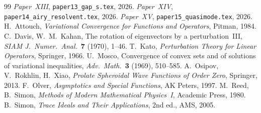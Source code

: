 \documentclass[12pt,a4paper]{amsart}
\theoremstyle{definition}
\begin{document}
\begin{thebibliography}{99}
 \textit{Paper~XIII}, \texttt{paper13\_gap\_s.tex}, 2026.
 \textit{Paper~XIV}, \texttt{paper14\_airy\_resolvent.tex}, 2026.
 \textit{Paper~XV}, \texttt{paper15\_quasimode.tex}, 2026.
 H.~Attouch, \textit{Variational Convergence
  for Functions and Operators}, Pitman, 1984.
 C.~Davis, W.~M.~Kahan,
  The rotation of eigenvectors by a perturbation~III,
  \textit{SIAM J.\ Numer.\ Anal.}\ \textbf{7} (1970), 1--46.
 T.~Kato, \textit{Perturbation Theory for Linear Operators},
  Springer, 1966.
 U.~Mosco,
  Convergence of convex sets and of solutions of variational inequalities,
  \textit{Adv.\ Math.}\ \textbf{3} (1969), 510--585.
 A.~Osipov, V.~Rokhlin, H.~Xiao,
  \textit{Prolate Spheroidal Wave Functions of Order Zero}, Springer, 2013.
 F.~Olver, \textit{Asymptotics and Special Functions},
  AK Peters, 1997.
 M.~Reed, B.~Simon,
  \textit{Methods of Modern Mathematical Physics~I}, Academic Press, 1980.
 B.~Simon, \textit{Trace Ideals and Their Applications},
  2nd ed., AMS, 2005.
\end{thebibliography}
\end{document}
